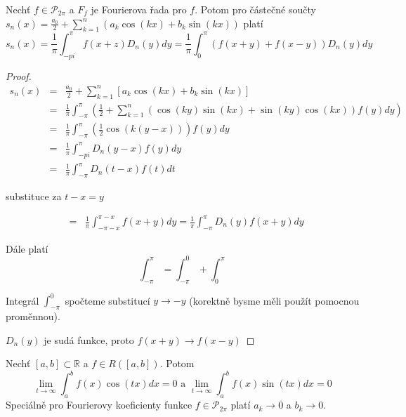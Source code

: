 \begin{vetal}
Nechť $f \in \mathcal{P}_{2 \pi}$ a $F_f$ je Fourierova řada pro $f$. Potom pro částečné součty $s_n(x) = \frac{a_0}{2} + \sum_{k=1}^{n} (a_k \cos ( kx) + b_k \sin ( kx ))$ platí
$$s_n(x) = \frac{1}{\pi} \int_{-pi}^\pi f(x+z)D_n(y)dy = \frac{1}{\pi} \int_0^\pi \left( f(x+y) + f(x-y) \right) D_n(y) dy$$
\end{vetal}

\begin{proof}
\begin{eqnarray*}
s_n(x) & = & \frac{a_0}{2} + \sum_{k=1}^{n} \left[ a_k \cos(kx) + b_k \sin(kx) \right] \\
& = & \frac{1}{\pi} \int_{-\pi}^\pi \left( \frac{1}{2} + \sum_{k=1}^n \left( \cos(ky) \sin(kx) + \sin(ky) \cos (kx) \right) f(y) dy \right) \\
& = & \frac{1}{\pi} \int_{-\pi}^\pi \left( \frac{1}{2} \cos(k(y-x))  \right) f(y) dy \\
& = & \frac{1}{\pi} \int_{-pi}^\pi D_n(y-x) f(y) dy \\
& = & \frac{1}{\pi} \int_{-\pi}^\pi D_n(t-x) f(t) dt 
\end{eqnarray*}

substituce za $t-x=y$

\begin{eqnarray*}
& = & \frac{1}{\pi} \int_{-\pi -x}^{\pi-x} f(x+y) dy = \frac{1}{\pi} \int_{-\pi}^\pi D_n(y) f(x+y) dy 
\end{eqnarray*}

Dále platí 
$$\int_{-\pi}^\pi = \int_{-\pi}^0 + \int_{0}^\pi$$

Integrál $\int_{-\pi}^0$ spočteme substitucí $y \rightarrow -y$ (korektně bysme měli použít pomocnou proměnnou).

$D_n(y)$ je sudá funkce, proto $f(x+y) \rightarrow f(x-y)$
\end{proof}

\begin{vetat}
\label{Riemann-Lebesqueovo lemma}
Nechť $[a,b] \subset \mathbb{R}$ a $f \in R([a,b])$. Potom
$$\lim_{t \rightarrow \infty} \int_a^b f(x) \cos(tx) dx = 0 \textrm{ a } \lim_{t \rightarrow \infty} \int_a^b f(x) \sin(tx) dx = 0$$
Speciálně pro Fourierovy koeficienty funkce $f \in \mathcal{P}_{2 \pi}$ platí $a_k \rightarrow 0$ a $b_k \rightarrow 0$.
\end{vetat}


